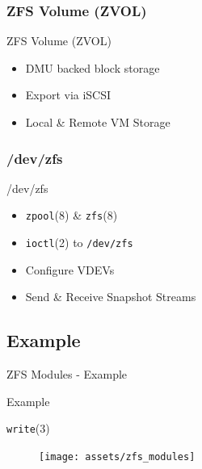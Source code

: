 \subsubsection{ZFS Volume (ZVOL)}
\begin{frame}{ZFS Volume (ZVOL)}
	\begin{itemize}
		\item DMU backed block storage
		\item Export via iSCSI
		\item Local \& Remote VM Storage %
	\end{itemize}
\end{frame}

\subsubsection{/dev/zfs}
\begin{frame}{/dev/zfs}
	\begin{itemize}
		\item \texttt{zpool}(8) \& \texttt{zfs}(8)
		\item \texttt{ioctl}(2) to \texttt{/dev/zfs}
		\item Configure VDEVs
		\item Send \& Receive Snapshot Streams %
	\end{itemize}
\end{frame}



\subsection{Example}
\begin{frame}{ZFS Modules - Example}
	\begin{center}
		\Huge Example
	\end{center}	
\end{frame}

\begin{frame}{\texttt{write}(3)}
\begin{figure}
	\centering
	\texttt{[image: assets/zfs\_modules]}
\end{figure}
\end{frame}

